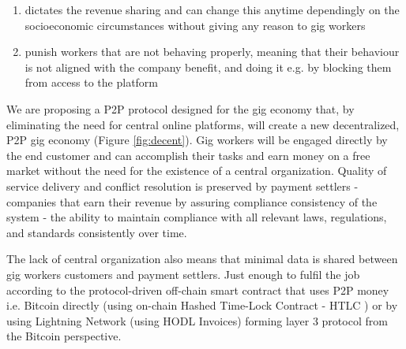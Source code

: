 \documentclass{article}
\begin{document}
\begin{enumerate}
\item dictates the revenue sharing and can change this anytime dependingly on the socioeconomic circumstances without giving any reason to gig workers
\item punish workers that are not behaving properly, meaning that their behaviour is not aligned with the company benefit, and doing it e.g. by blocking them from access to the platform
\end{enumerate}

We are proposing a P2P protocol designed for the gig economy that, by eliminating the need for central online platforms, will create a new decentralized, P2P gig economy (Figure \ref{fig:decent}). Gig workers will be engaged directly by the end customer and can accomplish their tasks and earn money on a free market without the need for the existence of a central organization. Quality of service delivery and conflict resolution is preserved by payment settlers - companies that earn their revenue by assuring compliance consistency of the system - the ability to maintain compliance with all relevant laws, regulations, and standards consistently over time. 

The lack of central organization also means that minimal data is shared between gig workers customers and payment settlers. Just enough to fulfil the job according to the protocol-driven off-chain smart contract that uses P2P money i.e. Bitcoin \cite{nakamoto2009bitcoin} directly (using on-chain Hashed Time-Lock Contract - HTLC \cite{poon2016bitcoin}) or by using Lightning Network \cite{poon2016bitcoin} (using HODL Invoices) forming layer 3 protocol from the Bitcoin perspective.
\end{document}
